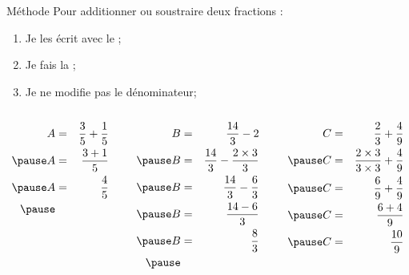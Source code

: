 \documentclass[xcolor={dvipsnames}]{beamer}
\begin{document}
\begin{frame}
	\begin{block}{Méthode}
		Pour additionner ou soustraire deux fractions :\pause
		
		\begin{enumerate}
			\item Je les écrit avec le ;\pause
			\item Je fais la ;\pause
			\item Je ne modifie pas le dénominateur;\pause
		\end{enumerate}
	\end{block}
	
	\begin{myexs}
		\begin{columns}
			
			\begin{column}{0.3\textwidth}
				\begin{eqnarray*}
					A &=& \frac{3}{5} + \frac{1}{5} \\ \pause
					A &=& \frac{3 + 1}{5}\\ \pause
					A &=& \frac{4}{5}\\ \pause
				\end{eqnarray*} 
				
			\end{column}
						
			\begin{column}{0.3\textwidth}
				\begin{eqnarray*}
					B &=& \frac{14}{3} - 2 \\ \pause
					B &=& \frac{14}{3} - \frac{2 \times 3}{3}\\ \pause
					B &=& \frac{14}{3} - \frac{6}{3}\\ \pause
					B &=& \frac{14 - 6}{3}\\ \pause
					B &=& \frac{8}{3}\\ \pause
				\end{eqnarray*}
			\end{column}
			
			
			\begin{column}{0.3\textwidth}
				\begin{eqnarray*}
					C &=& \frac{2}{3} + \frac{4}{9} \\ \pause
					C &=& \frac{2 \times 3}{3 \times 3} + \frac{4}{9}\\ \pause
					C &=& \frac{6}{9} + \frac{4}{9}\\ \pause
					C &=& \frac{6 + 4}{9}\\ \pause
					C &=& \frac{10}{9}\\
				\end{eqnarray*}
			\end{column}
			
			
		\end{columns}
	\end{myexs}
\end{frame}
\end{document}
